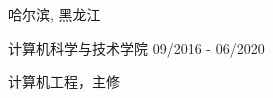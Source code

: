 \vspace{-6.0mm}

\begin{cventries}
\vspace{-1.5mm}

\cveducation
{}
{哈尔滨, 黑龙江}

\cvsubeducation
{计算机科学与技术学院}
{09/2016 - 06/2020}
{
    \begin{cvitems}
    \item {计算机工程，主修}
    \end{cvitems}
}

\end{cventries}